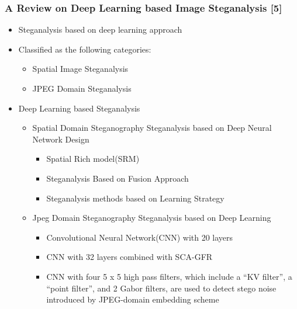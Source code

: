 \documentclass{beamer} %
\theoremstyle{definition} %
\begin{document}
\begin{frame}
\frametitle{A Review on Deep Learning based Image Steganalysis [5]   }
\begin{itemize}
	\item{Steganalysis based on deep learning approach  }
	\item{Classified as the following categories:}
	\begin{itemize}
		\item Spatial Image Steganalysis 
		\item JPEG Domain  Steganalysis  
	\end{itemize}
\end{itemize}
\begin{itemize}
	 \item{Deep Learning based Steganalysis  }
	\begin{itemize}
		\item {Spatial Domain Steganography Steganalysis based on Deep Neural Network Design  }
		\begin{itemize}
			\item Spatial Rich model(SRM)  
			\item Steganalysis Based on Fusion Approach 
			\item Steganalysis methods based on Learning Strategy
		\end{itemize}
	    \item{ Jpeg Domain Steganography Steganalysis based on Deep
	    	Learning  }
    	\begin{itemize}
    		\item Convolutional Neural Network(CNN) with 20 layers 
    		\item CNN with 32 layers combined with  SCA-GFR 
    		\item CNN with four 5 x 5 high pass filters, which
    		include a “KV filter”, a “point filter”, and 2 Gabor filters, are
    		used to detect stego noise introduced by JPEG-domain
    		embedding scheme 
    	\end{itemize}
	\end{itemize}
\end{itemize}
\end{frame}
\end{document}
